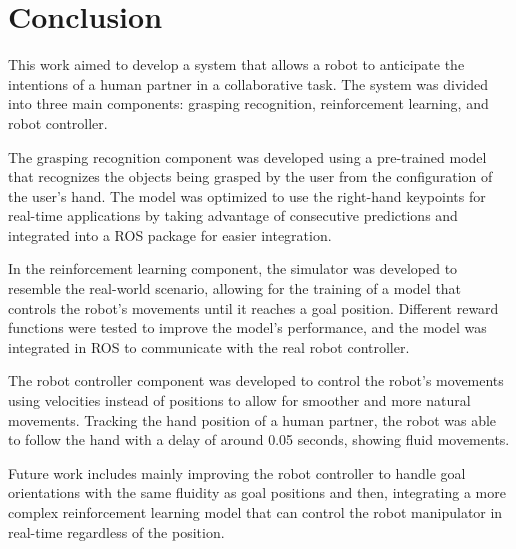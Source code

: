 \section{Conclusion}
\label{section:conclusions}

This work aimed to develop a system that allows a robot to anticipate the intentions of a human partner in a collaborative task. The system was divided into three main components: grasping recognition, reinforcement learning, and robot controller.

The grasping recognition component was developed using a pre-trained model that recognizes the objects being grasped by the user from the configuration of the user's hand. The model was optimized to use the right-hand keypoints for real-time applications by taking advantage of consecutive predictions and integrated into a ROS package for easier integration.

In the reinforcement learning component, the simulator was developed to resemble the real-world scenario, allowing for the training of a model that controls the robot's movements until it reaches a goal position. Different reward functions were tested to improve the model's performance, and the model was integrated in ROS to communicate with the real robot controller.

The robot controller component was developed to control the robot's movements using velocities instead of positions to allow for smoother and more natural movements. Tracking the hand position of a human partner, the robot was able to follow the hand with a delay of around 0.05 seconds, showing fluid movements.

Future work includes mainly improving the robot controller to handle goal orientations with the same fluidity as goal positions and then, integrating a more complex reinforcement learning model that can control the robot manipulator in real-time regardless of the position.
